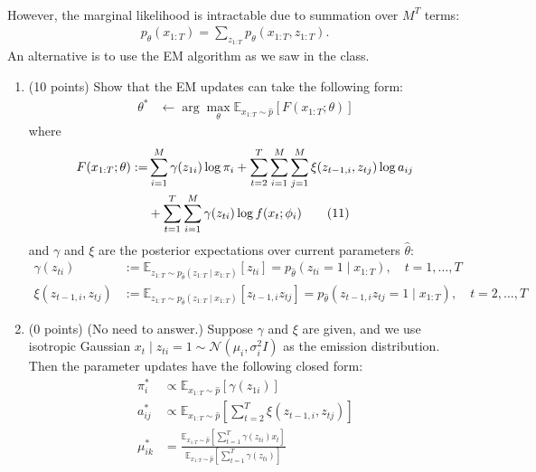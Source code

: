\documentclass[a3paper,12pt]{extarticle} %
\begin{document}
\begin{enumerate}
\begin{align}
\end{align}
However, the marginal likelihood is intractable due to summation over $M^T$ terms:
\begin{align}
    p_{\theta}(x_{1:T}) = \sum_{z_{1:T}} p_{\theta}(x_{1:T}, z_{1:T}). \tag{9}
\end{align}
An alternative is to use the EM algorithm as we saw in the class.
\begin{enumerate}
    \item (10 points) Show that the EM updates can take the following form:
    \begin{align}
        \theta^* &\leftarrow \arg\max_{\theta} \mathbb{E}_{x_{1:T} \sim \hat{p}} [F(x_{1:T}; \theta)] \tag{10}
    \end{align}
    where
    \begin{align}
        F(x_{1:T}; \theta) := &\sum_{i=1}^{M} \gamma(z_{1i}) \log \pi_i + \sum_{t=2}^{T} \sum_{i=1}^{M} \sum_{j=1}^{M} \xi(z_{t-1,i}, z_{tj}) \log a_{ij} \notag \\
        &+ \sum_{t=1}^{T} \sum_{i=1}^{M} \gamma(z_{ti}) \log f(x_t; \phi_i) \tag{11}
    \end{align}
    and $\gamma$ and $\xi$ are the posterior expectations over current parameters $\hat{\theta}$:
    \begin{align}
        \gamma(z_{ti}) &:= \mathbb{E}_{z_{1:T} \sim p_{\hat{\theta}}(z_{1:T} \mid x_{1:T})} [z_{ti}] = p_{\hat{\theta}}(z_{ti} = 1 \mid x_{1:T}), \quad t = 1, \ldots, T \tag{12} \\
        \xi(z_{t-1,i}, z_{tj}) &:= \mathbb{E}_{z_{1:T} \sim p_{\hat{\theta}}(z_{1:T} \mid x_{1:T})} [z_{t-1,i} z_{tj}] = p_{\hat{\theta}}(z_{t-1,i} z_{tj} = 1 \mid x_{1:T}), \quad t = 2, \ldots, T \tag{13}
    \end{align}
    \item (0 points) (No need to answer.) Suppose $\gamma$ and $\xi$ are given, and we use isotropic Gaussian $x_t \mid z_{ti} = 1 \sim \mathcal{N}(\mu_i, \sigma_i^2 I)$ as the emission distribution. Then the parameter updates have the following closed form:
    \begin{align}
        \pi_i^* &\propto \mathbb{E}_{x_{1:T} \sim \hat{p}} [\gamma(z_{1i})] \tag{14} \\
        a_{ij}^* &\propto \mathbb{E}_{x_{1:T} \sim \hat{p}} \left[ \sum_{t=2}^{T} \xi(z_{t-1,i}, z_{tj}) \right] \tag{15} \\
        \mu_{ik}^* &= \frac{\mathbb{E}_{x_{1:T} \sim \hat{p}} \left[ \sum_{t=1}^{T} \gamma(z_{ti}) x_t \right]}{\mathbb{E}_{x_{1:T} \sim \hat{p}} \left[ \sum_{t=1}^{T} \gamma(z_{ti}) \right]} \tag{16} \\

\end{align}
\end{enumerate}
\end{enumerate}
\end{document}
